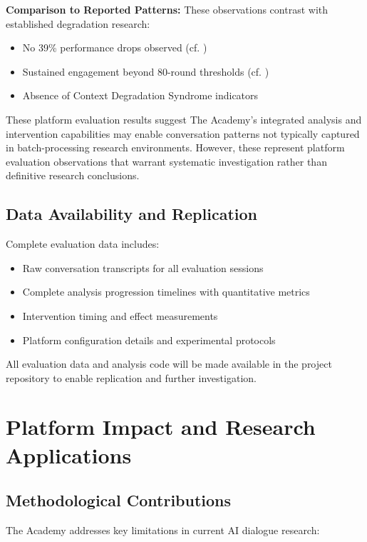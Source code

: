 \documentclass[11pt,letterpaper]{article}
\newcommand{\theacademy}{The Academy}
\begin{document}
\textbf{Comparison to Reported Patterns:}
These observations contrast with established degradation research:
\begin{itemize}
    \item No 39\% performance drops observed (cf. \citep{laban2025lost})
    \item Sustained engagement beyond 80-round thresholds (cf. \citep{chen2023chatarena})
    \item Absence of Context Degradation Syndrome indicators
\end{itemize}

These platform evaluation results suggest \theacademy{}'s integrated analysis and intervention capabilities may enable conversation patterns not typically captured in batch-processing research environments. However, these represent platform evaluation observations that warrant systematic investigation rather than definitive research conclusions.

\subsection{Data Availability and Replication}

Complete evaluation data includes:
\begin{itemize}
    \item Raw conversation transcripts for all evaluation sessions
    \item Complete analysis progression timelines with quantitative metrics
    \item Intervention timing and effect measurements
    \item Platform configuration details and experimental protocols
\end{itemize}

All evaluation data and analysis code will be made available in the project repository to enable replication and further investigation.

\section{Platform Impact and Research Applications}

\subsection{Methodological Contributions}

\theacademy{} addresses key limitations in current AI dialogue research:
\end{document}
